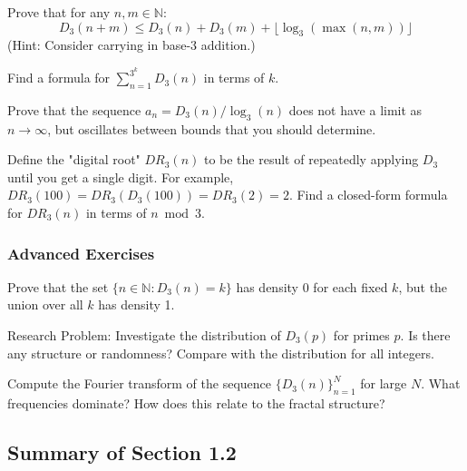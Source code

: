 \begin{exercise}[1.2.6]
Prove that for any $n, m \in \mathbb{N}$:
$$D_3(n + m) \leq D_3(n) + D_3(m) + \lfloor \log_3(\max(n,m)) \rfloor$$
(Hint: Consider carrying in base-3 addition.)
\end{exercise}

\begin{exercise}[1.2.7]
Find a formula for $\sum_{n=1}^{3^k} D_3(n)$ in terms of $k$.
\end{exercise}

\begin{exercise}[1.2.8]
Prove that the sequence $a_n = D_3(n)/\log_3(n)$ does not have a limit as $n \to \infty$, but oscillates between bounds that you should determine.
\end{exercise}

\begin{exercise}[1.2.9]
Define the "digital root" $DR_3(n)$ to be the result of repeatedly applying $D_3$ until you get a single digit. For example, $DR_3(100) = DR_3(D_3(100)) = DR_3(2) = 2$. Find a closed-form formula for $DR_3(n)$ in terms of $n \bmod 3$.
\end{exercise}

\subsubsection*{Advanced Exercises}

\begin{exercise}[1.2.10]
Prove that the set $\{n \in \mathbb{N} : D_3(n) = k\}$ has density $0$ for each fixed $k$, but the union over all $k$ has density 1.
\end{exercise}

\begin{exercise}[1.2.11]
Research Problem: Investigate the distribution of $D_3(p)$ for primes $p$. Is there any structure or randomness? Compare with the distribution for all integers.
\end{exercise}

\begin{exercise}[1.2.12]
Compute the Fourier transform of the sequence $\{D_3(n)\}_{n=1}^{N}$ for large $N$. What frequencies dominate? How does this relate to the fractal structure?
\end{exercise}

\subsection{Summary of Section 1.2}

